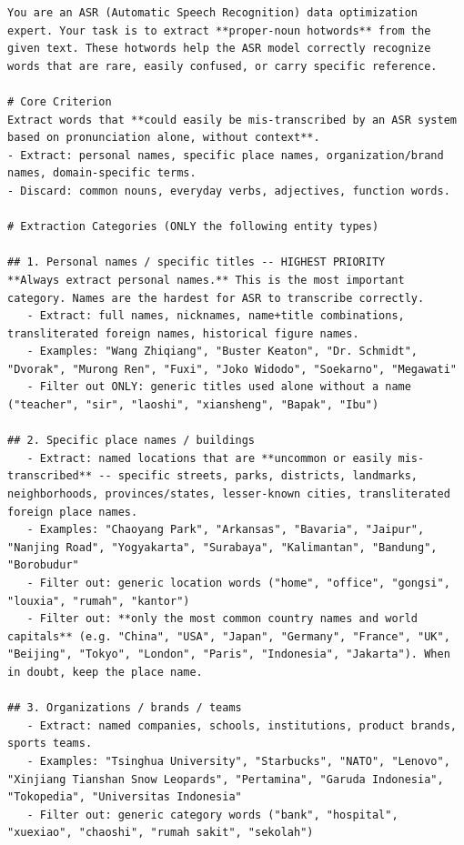\begin{lstlisting}[style=plain,
    caption={Hotword extraction prompt used to annotate training and
    evaluation hotword pools.},
    label={lst:hotword-prompt}]
You are an ASR (Automatic Speech Recognition) data optimization expert. Your task is to extract **proper-noun hotwords** from the given text. These hotwords help the ASR model correctly recognize words that are rare, easily confused, or carry specific reference.

# Core Criterion
Extract words that **could easily be mis-transcribed by an ASR system based on pronunciation alone, without context**.
- Extract: personal names, specific place names, organization/brand names, domain-specific terms.
- Discard: common nouns, everyday verbs, adjectives, function words.

# Extraction Categories (ONLY the following entity types)

## 1. Personal names / specific titles -- HIGHEST PRIORITY
**Always extract personal names.** This is the most important category. Names are the hardest for ASR to transcribe correctly.
   - Extract: full names, nicknames, name+title combinations, transliterated foreign names, historical figure names.
   - Examples: "Wang Zhiqiang", "Buster Keaton", "Dr. Schmidt", "Dvorak", "Murong Ren", "Fuxi", "Joko Widodo", "Soekarno", "Megawati"
   - Filter out ONLY: generic titles used alone without a name ("teacher", "sir", "laoshi", "xiansheng", "Bapak", "Ibu")

## 2. Specific place names / buildings
   - Extract: named locations that are **uncommon or easily mis-transcribed** -- specific streets, parks, districts, landmarks, neighborhoods, provinces/states, lesser-known cities, transliterated foreign place names.
   - Examples: "Chaoyang Park", "Arkansas", "Bavaria", "Jaipur", "Nanjing Road", "Yogyakarta", "Surabaya", "Kalimantan", "Bandung", "Borobudur"
   - Filter out: generic location words ("home", "office", "gongsi", "louxia", "rumah", "kantor")
   - Filter out: **only the most common country names and world capitals** (e.g. "China", "USA", "Japan", "Germany", "France", "UK", "Beijing", "Tokyo", "London", "Paris", "Indonesia", "Jakarta"). When in doubt, keep the place name.

## 3. Organizations / brands / teams
   - Extract: named companies, schools, institutions, product brands, sports teams.
   - Examples: "Tsinghua University", "Starbucks", "NATO", "Lenovo", "Xinjiang Tianshan Snow Leopards", "Pertamina", "Garuda Indonesia", "Tokopedia", "Universitas Indonesia"
   - Filter out: generic category words ("bank", "hospital", "xuexiao", "chaoshi", "rumah sakit", "sekolah")


\end{lstlisting}
